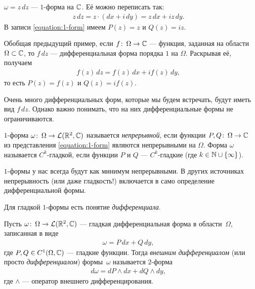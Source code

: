\documentclass[../complex-analysis.tex]{subfiles}
\begin{document}
\begin{exmpl*}
 $ \omega=z\,dz $ --- $ 1 $-форма на $ \mathbb{C} $. Её можно переписать так:
 \begin{align*}
  z\,dz = z \cdot (dx + i\,dy) = z\,dx + iz\,dy.
 \end{align*} В записи \eqref{equation:1-form} имеем  $ P(z)=z $ и $ Q(z)=iz $.
\end{exmpl*}

\begin{exmpl*}
 Обобщая предыдущий пример, если $ f \colon\,\Omega \to \mathbb{C} $ --- функция, заданная на области $ \Omega \subset \mathbb{C} $, то $ f\,dz $ --- дифференциальная форма порядка $ 1 $ на $ \Omega $. Раскрывая её, получаем
 \begin{align*}
  f(z)\,dz = f(z)\,dx + if(z)\,dy,
 \end{align*} то есть $ P(z) = f(z) $ и $ Q(z) = if(z) $.

 Очень много дифференциальных форм, которые мы будем встречать, будут иметь вид $ f\,dz $. Однако важно понимать, что на них дифференциальные формы не ограничиваются.
\end{exmpl*}

\begin{df*}
 $1$-форма $\omega \colon\, \Omega \to \mathcal{L}(\mathbb{R}^2, \mathbb{C})$ называется \textit{непрерывной}, если функции $P,Q \colon\, \Omega \to \mathbb{C}$ из представления \eqref{equation:1-form} являются непрерывными на $ \Omega $. Форма $\omega$ называется $C^{k}$-гладкой, если функции $P$ и $Q$ --- $C^{k}$-гладкие (где $k \in \mathbb{N} \cup \left\{ \infty \right\}$).
\end{df*}

$ 1 $-формы у нас всегда будут как минимум непрерывными. В других источниках непрерывность (или даже гладкость!) включается в само определение дифференциальной формы.

Для гладкой $ 1 $-формы есть понятие \emph{дифференциала}.

\begin{df}
 Пусть $ \omega\colon\,\Omega \to \mathcal{L}(\mathbb{R}^2, \mathbb{C}) $ --- гладкая дифференциальная форма в области~$ \Omega $, записанная в виде
 \begin{align*}
  \omega = P\,dx + Q\,dy,
 \end{align*} где $ P,Q \in C^{1}(\Omega,\mathbb{C}) $ --- гладкие функции. Тогда \emph{внешним дифференциалом} (или просто \emph{дифференциалом}) формы~$ \omega $ называется $ 2 $-форма
 \begin{align*}
  d\omega = dP \land dx + dQ \land dy,
 \end{align*} где $ \land $ --- оператор внешнего дифференцирования.
\end{df}
\end{document}
